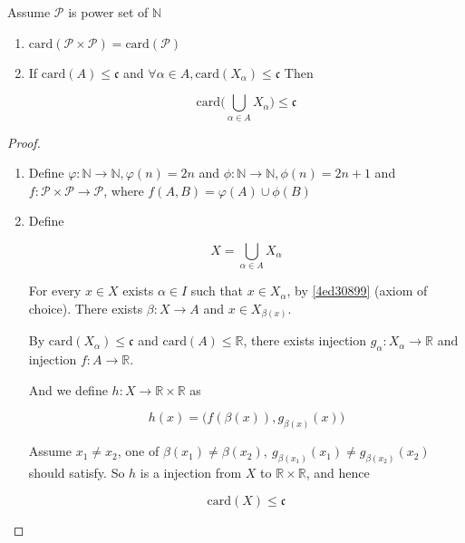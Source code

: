 \begin{thm}
    Assume $\mathcal{P}$ is power set of $\mathbb{N}$

    \begin{enumerate}
        \item $\mathrm{card}(\mathcal{P} \times \mathcal{P}) = \mathrm{card}(\mathcal{P})$

        \item If $\mathrm{card}(A) \le \mathfrak{c}$ and $\forall \alpha \in A, \mathrm{card}(X_{\alpha}) \le \mathfrak{c}$ Then 
        
        \[
        \mathrm{card} \Bigg( \bigcup_{\alpha \in A} X_{\alpha} \Bigg) \le \mathfrak{c} 
        \]
        
    \end{enumerate}
\end{thm}

\begin{proof}
    \begin{enumerate}
        \item  Define $\varphi: \mathbb{N} \to \mathbb{N}, \varphi(n) = 2n$ and $\phi: \mathbb{N} \to \mathbb{N}, \phi(n) = 2n + 1$
    and $f: \mathcal{P} \times \mathcal{P} \to \mathcal{P}$, where $f(A, B) = \varphi(A) \cup \phi(B)$

        \item Define

        \[
            X = \bigcup_{\alpha \in A}X_{\alpha}
        \]

        For every $x \in X$ exists $\alpha \in I$ such that $x \in X_{\alpha}$, by \cref{4ed30899} (axiom of choice).
        There exists $\beta: X \to A $ and $x \in X_{\beta(x)}$.

        By $\mathrm{card}(X_{\alpha}) \le \mathfrak{c}$ and $\mathrm{card}(A) \le \mathbb{R}$, there exists injection $g_{\alpha}: X_{\alpha} \to \mathbb{R}$
        and injection $f: A \to \mathbb{R}$.

        And we define $h: X \to \mathbb{R} \times \mathbb{R}$ as

        \[
            h(x) = \Big( f(\beta(x)), g_{\beta(x)}(x) \Big)
        \]

        Assume $x_1 \ne x_2$, one of $\beta(x_1) \ne \beta(x_2),\: g_{\beta(x_1)}(x_1) \ne g_{\beta{(x_2)}}(x_2)$ should satisfy.
        So  $h$ is a injection from $X$ to $\mathbb{R} \times \mathbb{R}$, and hence

        \[
            \mathrm{card}(X) \le \mathfrak{c}
        \]
    \end{enumerate}
\end{proof}

